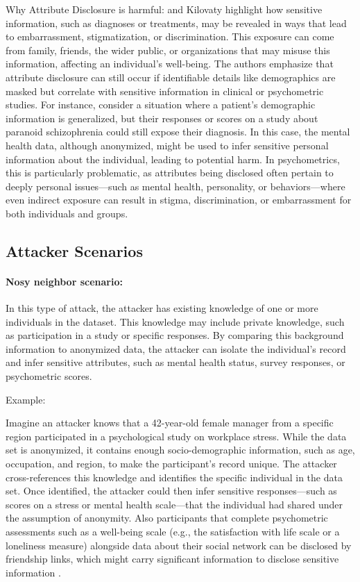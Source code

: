 \documentclass{article}
\begin{document}
Why Attribute Disclosure is harmful:
\cite{2022_Wairimu} and Kilovaty \cite{2021_Kilovaty} highlight how sensitive information, such as diagnoses or treatments, may be revealed in ways that lead to embarrassment, stigmatization, or discrimination. This exposure can come from family, friends, the wider public, or organizations that may misuse this information, affecting an individual’s well-being. The authors emphasize that attribute disclosure can still occur if identifiable details like demographics are masked but correlate with sensitive information in clinical or psychometric studies.
For instance, consider a situation where a patient's demographic information is generalized, but their responses or scores on a study about paranoid schizophrenia could still expose their diagnosis. In this case, the mental health data, although anonymized, might be used to infer sensitive personal information about the individual, leading to potential harm. In psychometrics, this is particularly problematic, as attributes being disclosed often pertain to deeply personal issues—such as mental health, personality, or behaviors—where even indirect exposure can result in stigma, discrimination, or embarrassment for both individuals and groups.
\newline


\subsection{Attacker Scenarios}

\paragraph{Nosy neighbor scenario:}  
In this type of attack, the attacker has existing knowledge of one or more individuals in the dataset. This knowledge may include  private knowledge, such as participation in a study or specific responses. By comparing this background information to anonymized data, the attacker can isolate the individual's record and infer sensitive attributes, such as mental health status, survey responses, or psychometric scores.

Example:

Imagine an attacker knows that a 42-year-old female manager from a specific region participated in a psychological study on workplace stress. While the data set is anonymized, it contains enough socio-demographic information, such as age, occupation, and region, to make the participant’s record unique. The attacker cross-references this knowledge and identifies the specific individual in the data set. Once identified, the attacker could then infer sensitive responses—such as scores on a stress or mental health scale—that the individual had shared under the assumption of anonymity.
Also participants that complete psychometric assessments such as a well-being scale (e.g., the satisfaction with life scale or a loneliness measure) alongside data about their social network can be disclosed by friendship links, which might carry significant information to disclose sensitive information \citep{Zheleva09}.
\end{document}
